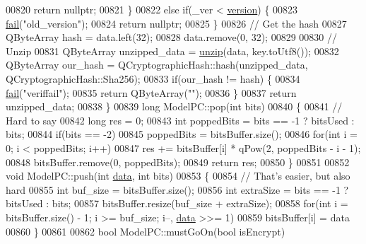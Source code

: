 \begin{DoxyCode}
{00820         \textcolor{keywordflow}{return} \textcolor{keyword}{nullptr};
00821     \}
00822     \textcolor{keywordflow}{else} \textcolor{keywordflow}{if}(\_ver < \hyperlink{class_model_p_c_a5af48ab89e19be42a94c34ba00249401}{version}) \{
00823         \hyperlink{class_model_p_c_a47464b59b7e37fcee25e55475708aabd}{fail}(\textcolor{stringliteral}{"old\_version"});
00824         \textcolor{keywordflow}{return} \textcolor{keyword}{nullptr};
00825     \}
00826     \textcolor{comment}{// Get the hash}
00827     QByteArray hash = data.left(32);
00828     data.remove(0, 32);
00829 
00830     \textcolor{comment}{// Unzip}
00831     QByteArray unzipped\_data = \hyperlink{class_model_p_c_a6da88f166785a49f73b22c169f956fd0}{unzip}(data, key.toUtf8());
00832     QByteArray our\_hash = QCryptographicHash::hash(unzipped\_data, QCryptographicHash::Sha256);
00833     \textcolor{keywordflow}{if}(our\_hash != hash) \{
00834         \hyperlink{class_model_p_c_a47464b59b7e37fcee25e55475708aabd}{fail}(\textcolor{stringliteral}{"veriffail"});
00835         \textcolor{keywordflow}{return} QByteArray(\textcolor{stringliteral}{""});
00836     \}
00837     \textcolor{keywordflow}{return} unzipped\_data;
00838 \}
00839 \textcolor{keywordtype}{long} ModelPC::pop(\textcolor{keywordtype}{int} bits)
00840 \{
00841     \textcolor{comment}{// Hard to say}
00842     \textcolor{keywordtype}{long} res = 0;
00843     \textcolor{keywordtype}{int} poppedBits = bits == -1 ? bitsUsed : bits;
00844     \textcolor{keywordflow}{if}(bits == -2)
00845         poppedBits = bitsBuffer.size();
00846     \textcolor{keywordflow}{for}(\textcolor{keywordtype}{int} i = 0; i < poppedBits; i++)
00847         res += bitsBuffer[i] * qPow(2, poppedBits - i - 1);
00848     bitsBuffer.remove(0, poppedBits);
00849     \textcolor{keywordflow}{return} res;
00850 \}
00851 
00852 \textcolor{keywordtype}{void} ModelPC::push(\textcolor{keywordtype}{int} \hyperlink{namespace_errors_dict_setup_af570460846fb9f0c91abd308a095dcdc}{data}, \textcolor{keywordtype}{int} bits)
00853 \{
00854     \textcolor{comment}{// That's easier, but also hard}
00855     \textcolor{keywordtype}{int} buf\_size = bitsBuffer.size();
00856     \textcolor{keywordtype}{int} extraSize = bits == -1 ? bitsUsed : bits;
00857     bitsBuffer.resize(buf\_size + extraSize);
00858     \textcolor{keywordflow}{for}(\textcolor{keywordtype}{int} i = bitsBuffer.size() - 1; i >= buf\_size; i--, \hyperlink{namespace_errors_dict_setup_af570460846fb9f0c91abd308a095dcdc}{data} >>= 1)
00859         bitsBuffer[i] = data %
00860 \}
00861 
00862 \textcolor{keywordtype}{bool} ModelPC::mustGoOn(\textcolor{keywordtype}{bool} isEncrypt)
}
\end{DoxyCode}
